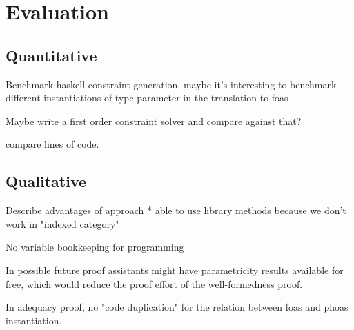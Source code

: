 \chapter{Evaluation}
\label{cha:4}


\section{Quantitative}
Benchmark haskell constraint generation, maybe it's interesting to benchmark different instantiations of type parameter in the translation to foas

Maybe write a first order constraint solver and compare against that?

compare lines of code.

\section{Qualitative}

Describe advantages of approach
* able to use library methods because we don't work in "indexed category"

No variable bookkeeping for programming

In possible future proof assistants might have parametricity results available for free, which would reduce the proof effort of the well-formedness proof.

In adequacy proof, no "code duplication" for the relation between foas and phoas instantiation.




